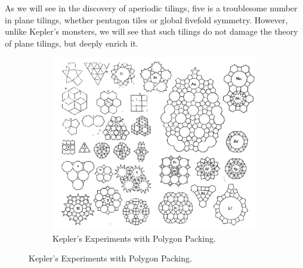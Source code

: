 \documentclass[
  oneside,
  11pt, a4paper,
  footinclude=true,
  headinclude=true,
  cleardoublepage=empty
]{scrbook}
\begin{document}
As we will see in the discovery of aperiodic tilings, five is a troublesome number in plane tilings, whether pentagon tiles or global fivefold symmetry. However, unlike Kepler's monsters, we will see that such tilings do not damage the theory of plane tilings, but deeply enrich it.

\begin{figure}[H]
        \centering
        \begin{subfigure}[b]{0.9\textwidth}
                \includegraphics[width=\textwidth]{KeplersExperiments}
                \caption{Kepler's Experiments with Polygon Packing. \cite{Senechal1996}}
                \label{fig:Experiments}
        \end{subfigure}
        

\end{figure}
\end{document}
